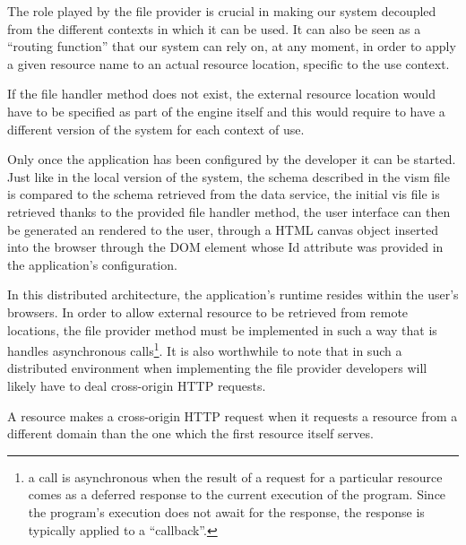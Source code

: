 The role played by the file provider is crucial in making our system decoupled from the different contexts in which it can be used. It can also be seen as a ``routing function'' that our system can rely on, at any moment, in order to apply a given resource name to an actual resource location, specific to the use context.

If the file handler method does not exist, the external resource location would have to be specified as part of the engine itself and this would require to have a different version of the system for each context of use.

Only once the application has been configured by the developer it can be started. Just like in the local version of the system, the schema described in the vism file is compared to the schema retrieved from the data service, the initial vis file is retrieved thanks to the provided file handler method, the user interface can then be generated an rendered to the user, through a HTML canvas object inserted into the browser through the DOM element whose Id attribute was provided in the application's configuration.

In this distributed architecture, the application's runtime resides within the user's browsers. In order to allow external resource to be retrieved from remote locations, the file provider method must be implemented in such a way that is handles asynchronous calls\footnote{a call is asynchronous when the result of a request for a particular resource comes as a deferred response to the current execution of the program. Since the program's execution does not await for the response, the response is typically applied to a ``callback''.  }. It is also worthwhile to note that in such a distributed environment when implementing the file provider developers will likely have to deal cross-origin HTTP requests.

A resource makes a cross-origin HTTP request when it requests a resource from a different domain than the one which the first resource itself serves. 